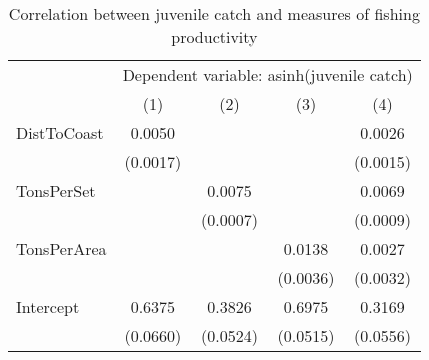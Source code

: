 \begin{table}[tb]
\centering
\caption{Correlation between juvenile catch and measures of fishing productivity} 
\label{balance_relevantvariables}
\begin{tabular}{lcccc}
   \toprule & \multicolumn{4}{c}{Dependent variable: asinh(juvenile catch)} \\  & (1) & (2) & (3) & (4) \\ 
   \midrule DistToCoast & 0.0050 &  &  & 0.0026 \\ 
   & (0.0017) &  &  & (0.0015) \\ 
  TonsPerSet &  & 0.0075 &  & 0.0069 \\ 
   &  & (0.0007) &  & (0.0009) \\ 
  TonsPerArea &  &  & 0.0138 & 0.0027 \\ 
   &  &  & (0.0036) & (0.0032) \\ 
  Intercept & 0.6375 & 0.3826 & 0.6975 & 0.3169 \\ 
   & (0.0660) & (0.0524) & (0.0515) & (0.0556) \\ 
   \bottomrule \end{tabular}
\end{table}
